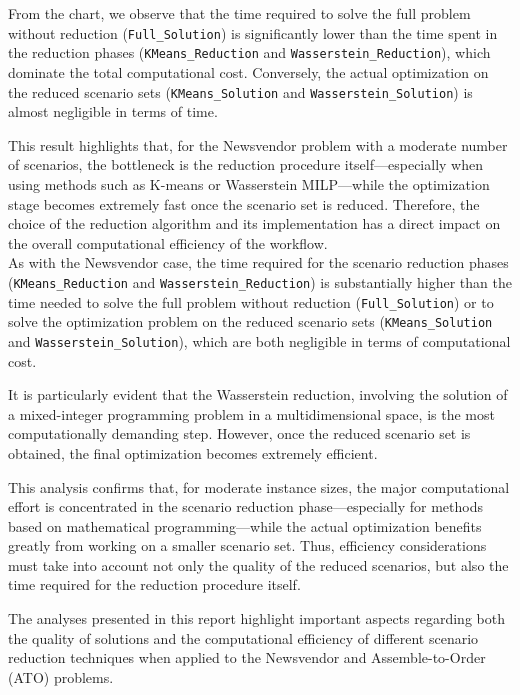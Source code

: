 \documentclass[a4paper,12pt]{article}
\begin{document}
\noindent From the chart, we observe that the time required to solve the full problem without reduction (\texttt{Full\_Solution}) is significantly lower than the time spent in the reduction phases (\texttt{KMeans\_Reduction} and \texttt{Wasserstein\_Reduction}), which dominate the total computational cost. Conversely, the actual optimization on the reduced scenario sets (\texttt{KMeans\_Solution} and \texttt{Wasserstein\_Solution}) is almost negligible in terms of time. 
	
	This result highlights that, for the Newsvendor problem with a moderate number of scenarios, the bottleneck is the reduction procedure itself—especially when using methods such as K-means or Wasserstein MILP—while the optimization stage becomes extremely fast once the scenario set is reduced. Therefore, the choice of the reduction algorithm and its implementation has a direct impact on the overall computational efficiency of the workflow. \\
	
	
	
	As with the Newsvendor case, the time required for the scenario reduction phases (\texttt{KMeans\_Reduction} and \texttt{Wasserstein\_Reduction}) is substantially higher than the time needed to solve the full problem without reduction (\texttt{Full\_Solution}) or to solve the optimization problem on the reduced scenario sets (\texttt{KMeans\_Solution} and \texttt{Wasserstein\_Solution}), which are both negligible in terms of computational cost.
	
	It is particularly evident that the Wasserstein reduction, involving the solution of a mixed-integer programming problem in a multidimensional space, is the most computationally demanding step. However, once the reduced scenario set is obtained, the final optimization becomes extremely efficient. 
	
	This analysis confirms that, for moderate instance sizes, the major computational effort is concentrated in the scenario reduction phase—especially for methods based on mathematical programming—while the actual optimization benefits greatly from working on a smaller scenario set. Thus, efficiency considerations must take into account not only the quality of the reduced scenarios, but also the time required for the reduction procedure itself.
	
	
	The analyses presented in this report highlight important aspects regarding both the quality of solutions and the computational efficiency of different scenario reduction techniques when applied to the Newsvendor and Assemble-to-Order (ATO) problems.\\
	
\end{document}
